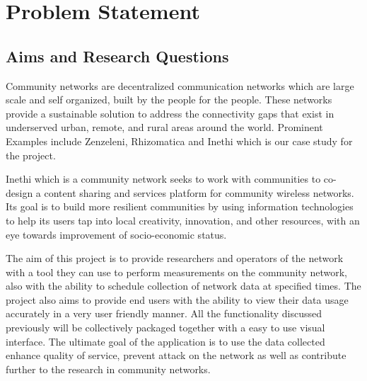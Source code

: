 \section{Problem Statement}
\subsection{Aims and Research Questions}
Community networks are decentralized communication networks which are large scale and self organized, built by the people for the people\cite{Braem:2013:CRC:2500098.2500108}. These networks provide a sustainable solution to address the connectivity gaps that exist in underserved urban, remote, and rural areas around the world\cite{Braem:2015:AEQ:2830629.2830639}. Prominent Examples include Zenzeleni, Rhizomatica and Inethi which is our case study for the project.  

Inethi which is a community network seeks to work with communities to co-design a content sharing and services platform for community wireless networks\cite{inethi}. Its goal is to build more resilient communities by using information technologies to help its users tap into local creativity, innovation, and other resources, with an eye towards improvement of socio-economic status\cite{inethi}.

The aim of this project is to provide researchers and operators of the network with a tool they can use to perform measurements on the community network, also with the ability to schedule collection of network data at specified times. The project also aims to provide end users with the ability to view their data usage accurately in a very user friendly manner. All the functionality discussed previously will be collectively packaged together with a easy to use visual interface. The ultimate goal of the application is to use the data collected enhance quality of service, prevent attack on the network as well as contribute further to the research in community networks.
